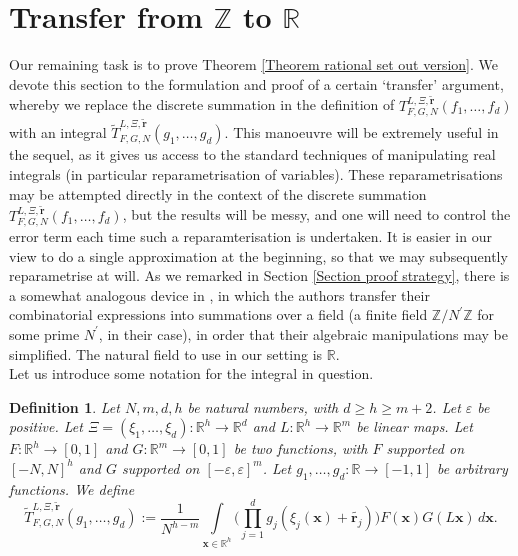 \documentclass[12pt,a4paper,twoside,reqno]{amsart}
\newtheorem{Definition}[Theorem]{Definition}
\numberwithin{equation}{section}
\begin{document}
\section{Transfer from $\mathbb{Z}$ to $\mathbb{R}$}
\label{section transfer}
Our remaining task is to prove Theorem \ref{Theorem rational set out version}. We devote this section to the formulation and proof of a certain `transfer' argument, whereby we replace the discrete summation in the definition of $T_{F,G,N}^{L,\Xi,\widetilde{\mathbf{r}}}(f_1,\dots,f_d)$ with an integral $\widetilde{T}^{L,\Xi,\widetilde{\mathbf{r}}}_{F,G,N}(g_1,\dots,g_{d})$. This manoeuvre will be extremely useful in the sequel, as it gives us access to the standard techniques of manipulating real integrals (in particular reparametrisation of variables). These reparametrisations may be attempted directly in the context of the discrete summation $T_{F,G,N}^{L,\Xi,\widetilde{\mathbf{r}}}(f_1,\dots,f_d)$, but the results will be messy, and one will need to control the error term each time such a reparamterisation is undertaken. It is easier in our view to do a single approximation at the beginning, so that we may subsequently reparametrise at will. As we remarked in Section \ref{Section proof strategy}, there is a somewhat analogous device in \cite{GT10}, in which the authors transfer their combinatorial expressions into summations over a field (a finite field $\mathbb{Z}/N^\prime \mathbb{Z}$ for some prime $N^\prime$, in their case), in order that their algebraic manipulations may be simplified. The natural field to use in our setting is $\mathbb{R}$. \\

Let us introduce some notation for the integral in question. 

\begin{Definition}
\label{Definition really continuous solution count}
Let $N,m,d,h$ be natural numbers, with $d\geqslant h\geqslant m+2$. Let $\varepsilon$ be positive. Let $\Xi = (\xi_1,\dots,\xi_d):\mathbb{R}^h\longrightarrow \mathbb{R}^d$ and $L:\mathbb{R}^{h}\longrightarrow \mathbb{R}^m$ be linear maps. Let $F:\mathbb{R}^{h}\rightarrow [0,1]$ and $G:\mathbb{R}^m\rightarrow [0,1]$ be two functions, with $F$ supported on $[-N,N]^h$ and $G$ supported on $[-\varepsilon,\varepsilon]^m$. Let $g_1,\dots,g_{d}:\mathbb{R}\longrightarrow [-1,1]$ be arbitrary functions. We define
\begin{equation}
\label{definiton of the solution count form}
\widetilde{T}^{L,\Xi,\widetilde{\mathbf{r}}}_{F,G,N}(g_1,\dots,g_{d}) := \frac{1}{N^{h-m}}\int\limits_{\mathbf{x}\in \mathbb{R}^h}\Big(\prod\limits_{j=1}^{d}g_j(\xi_j(\mathbf{x})+ \widetilde{\mathbf{r}_j})\Big)F(\mathbf{x})G(L\mathbf{x})\, d\mathbf{x}.
\end{equation}
\end{Definition}
\end{document}
